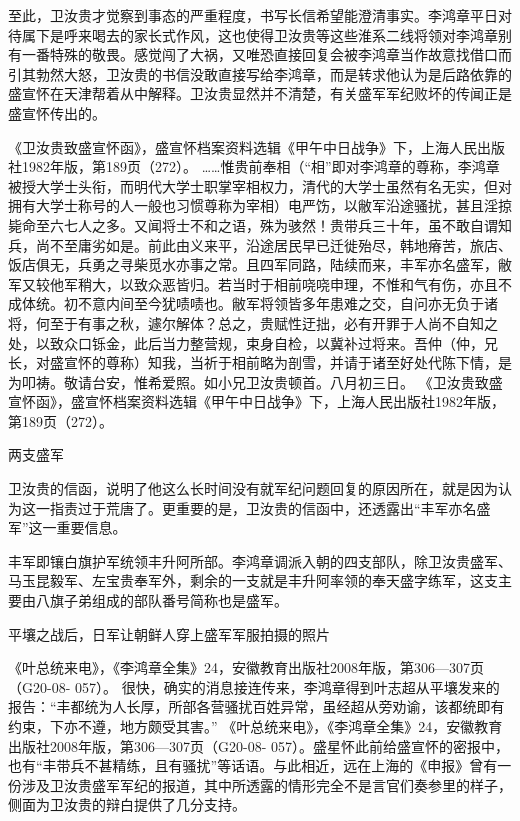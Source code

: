 \documentclass[12pt,UTF8]{ctexbook}
\begin{document}
至此，卫汝贵才觉察到事态的严重程度，书写长信希望能澄清事实。李鸿章平日对待属下是呼来喝去的家长式作风，这也使得卫汝贵等这些淮系二线将领对李鸿章别有一番特殊的敬畏。感觉闯了大祸，又唯恐直接回复会被李鸿章当作故意找借口而引其勃然大怒，卫汝贵的书信没敢直接写给李鸿章，而是转求他认为是后路依靠的盛宣怀在天津帮着从中解释。卫汝贵显然并不清楚，有关盛军军纪败坏的传闻正是盛宣怀传出的。

《卫汝贵致盛宣怀函》，盛宣怀档案资料选辑《甲午中日战争》下，上海人民出版社1982年版，第189页（272）。
……惟贵前奉相（“相”即对李鸿章的尊称，李鸿章被授大学士头衔，而明代大学士职掌宰相权力，清代的大学士虽然有名无实，但对拥有大学士称号的人一般也习惯尊称为宰相）电严饬，以敝军沿途骚扰，甚且淫掠毙命至六七人之多。又闻将士不和之语，殊为骇然！贵带兵三十年，虽不敢自谓知兵，尚不至庸劣如是。前此由义来平，沿途居民早已迁徙殆尽，韩地瘠苦，旅店、饭店俱无，兵勇之寻柴觅水亦事之常。且四军同路，陆续而来，丰军亦名盛军，敝军又较他军稍大，以致众恶皆归。若当时于相前哓哓申理，不惟和气有伤，亦且不成体统。初不意内间至今犹啧啧也。敝军将领皆多年患难之交，自问亦无负于诸将，何至于有事之秋，遽尔解体？总之，贵赋性迂拙，必有开罪于人尚不自知之处，以致众口铄金，此后当力整营规，束身自检，以冀补过将来。吾仲（仲，兄长，对盛宣怀的尊称）知我，当祈于相前略为剖雪，并请于诸至好处代陈下情，是为叩祷。敬请台安，惟希爱照。如小兄卫汝贵顿首。八月初三日。 《卫汝贵致盛宣怀函》，盛宣怀档案资料选辑《甲午中日战争》下，上海人民出版社1982年版，第189页（272）。

两支盛军

卫汝贵的信函，说明了他这么长时间没有就军纪问题回复的原因所在，就是因为认为这一指责过于荒唐了。更重要的是，卫汝贵的信函中，还透露出“丰军亦名盛军”这一重要信息。

丰军即镶白旗护军统领丰升阿所部。李鸿章调派入朝的四支部队，除卫汝贵盛军、马玉昆毅军、左宝贵奉军外，剩余的一支就是丰升阿率领的奉天盛字练军，这支主要由八旗子弟组成的部队番号简称也是盛军。


平壤之战后，日军让朝鲜人穿上盛军军服拍摄的照片

《叶总统来电》，《李鸿章全集》24，安徽教育出版社2008年版，第306—307页（G20-08- 057）。
很快，确实的消息接连传来，李鸿章得到叶志超从平壤发来的报告：“丰都统为人长厚，所部各营骚扰百姓异常，虽经超从旁劝谕，该都统即有约束，下亦不遵，地方颇受其害。” 《叶总统来电》，《李鸿章全集》24，安徽教育出版社2008年版，第306—307页（G20-08- 057）。盛星怀此前给盛宣怀的密报中，也有“丰带兵不甚精练，且有骚扰”等话语。与此相近，远在上海的《申报》曾有一份涉及卫汝贵盛军军纪的报道，其中所透露的情形完全不是言官们奏参里的样子，侧面为卫汝贵的辩白提供了几分支持。
\end{document}
